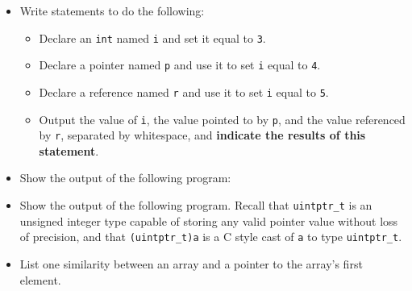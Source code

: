 \begin{itemize}

  \item Write statements to do the following:
    \begin{itemize}
      \item Declare an \texttt{int} named \texttt{i} and set
        it equal to \texttt{3}.
      \item Declare a pointer named \texttt{p} and use it to set
        \texttt{i} equal to \texttt{4}.
      \item Declare a reference named \texttt{r} and use it to set
        \texttt{i} equal to \texttt{5}.
      \item Output the value of \texttt{i}, the value pointed to by
        \texttt{p}, and the value referenced by \texttt{r},
        separated by whitespace, and \textbf{indicate the results of this
        statement}.
    \end{itemize}
    \vfill

  \item Show the output of the following program:

    \filbreak

  \item Show the output of the following program.  Recall that
    \texttt{uintptr_t} is an unsigned integer type capable of
    storing any valid pointer value without loss of precision, and that
    \texttt{(uintptr_t)a} is a C style cast of \texttt{a} to
    type \texttt{uintptr_t}.
    \vspace{3ex}

  \item List one similarity between an array and a pointer to the array's first
    element.
    \vfill


\end{itemize}
